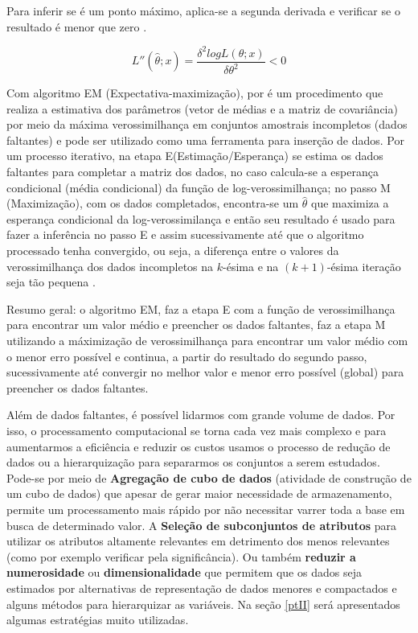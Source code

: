 \documentclass[
  openany]{book}
\begin{document}
Para inferir se é um ponto máximo, aplica-se a segunda derivada e verificar se o resultado é menor que zero \citep{bolfarine2001introduccao}.

\begin{equation}
  L''(\hat{ \theta};x)=\frac{\delta^2 log L(\theta;x)}{\delta \theta^2}<0
\label{eq:derivadadoisverossimilhanca}
\end{equation}

Com algoritmo EM (Expectativa-maximização), por \citet{dempster1977maximum} é um procedimento que realiza a estimativa dos parâmetros (vetor de médias e a matriz de covariância) por meio da máxima verossimilhança em conjuntos amostrais incompletos (dados faltantes) e pode ser utilizado como uma ferramenta para inserção de dados. Por um processo iterativo, na etapa E(Estimação/Esperança) se estima os dados faltantes para completar a matriz dos dados, no caso calcula-se a esperança condicional (média condicional) da função de log-verossimilhança; no passo M (Maximização), com os dados completados, encontra-se um \(\hat{\theta}\) que maximiza a esperança condicional da log-verossimilança e então seu resultado é usado para fazer a inferência no passo E e assim sucessivamente até que o algoritmo processado tenha convergido, ou seja, a diferença entre o valores da verossimilhança dos dados incompletos na \(k\)-ésima e na \((k+1)\)-ésima iteração seja tão pequena \citetext{\citealp[ ]{enders2010applied}; \citealp{pereira2019inserccao}}.

Resumo geral: o algoritmo EM, faz a etapa E com a função de verossimilhança para encontrar um valor médio e preencher os dados faltantes, faz a etapa M utilizando a máximização de verossimilhança para encontrar um valor médio com o menor erro possível e continua, a partir do resultado do segundo passo, sucessivamente até convergir no melhor valor e menor erro possível (global) para preencher os dados faltantes.

Além de dados faltantes, é possível lidarmos com grande volume de dados. Por isso, o processamento computacional se torna cada vez mais complexo e para aumentarmos a eficiência e reduzir os custos usamos o processo de redução de dados ou a hierarquização para separarmos os conjuntos a serem estudados. Pode-se por meio de \textbf{Agregação de cubo de dados} (atividade de construção de um cubo de dados) que apesar de gerar maior necessidade de armazenamento, permite um processamento mais rápido por não necessitar varrer toda a base em busca de determinado valor. A \textbf{Seleção de subconjuntos de atributos} para utilizar os atributos altamente relevantes em detrimento dos menos relevantes (como por exemplo verificar pela significância). Ou também \textbf{reduzir a numerosidade } ou \textbf{dimensionalidade} que permitem que os dados seja estimados por alternativas de representação de dados menores e compactados e alguns métodos para hierarquizar as variáveis. Na seção \ref{ptII} será apresentados algumas estratégias muito utilizadas.
\end{document}
